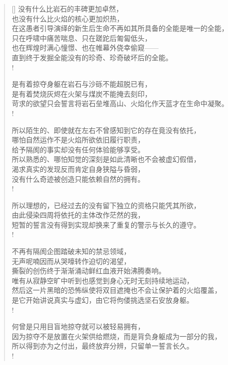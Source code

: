 \documentclass[UTF8, 12pt, a4paper]{ctexrep} %
\begin{document}
\begin{verse}[\versewidth]
没有什么比岩石的丰碑更加卓然，\\
也没有什么比火焰的核心更加炽热，\\
在这愚者引导演绎的新生后生命不再如其所具备的全能是唯一的全能，\\
只在呼啸中痛苦喘息、只在蹉跎后匍匐低头，\\
也在辉煌时满心憧憬、也在帷幕外侥幸偷窥——\\
直到终于发掘全能没有的珍奇、珍奇破坏后的全能。\\!

是有着掠夺身躯在岩石与沙砾不能超脱已有，\\
是有着焚烧灰烬在火架与煤炭不能掩去刻印，\\
苛求的欲望只会誓言将岩石垒堆高山、火焰化作天蓝才在生命中凝聚。\\!

所以陌生的、即使就在左右不曾感知到它的存在竟没有依托，\\
哪怕自然运作不是火焰所欲依旧履行职责，\\
给予隔阂的事实却没有任何体验能够享受。\\
所以熟悉的、哪怕知觉的深刻是如此清晰也不会被虚幻假借，\\
渴求真实的发现反而肯定自身狭隘与昏弱，\\
没有什么奇迹被创造只能依赖自然的拥有。\\!

所以理想的，已经过去的没有留下独立的资格只能凭其所欲，\\
由此侵染四周将依托的主体改作茫然的我，\\
短暂的誓言没有得到实现却换来了重复的警示与长久的遵守。\\!

不再有隔阂企图踏破未知的禁忌领域，\\
无声呢喃因而从哭嚎转作迫切的渴望，\\
撕裂的创伤终于渐渐涌动鲜红血液开始沸腾奏响。\\
唯有从寂静空旷中听到也感觉到身心无时无刻持续地运动，\\
然后这一片黑暗的恐怖纵使将双目遮掩也不会让保护着的火焰覆盖，\\
是它开始讲说真实与虚幻，由它将佝偻挑选坚石安放身躯。\\!

何曾是只用目盲地掠夺就可以被轻易拥有，\\
因为掠夺不是放置在火架供给燃烧，而是背负身躯成为一部分的我，\\
所以得到亦为之付出，最终放弃分辨，只留单一誓言长久。\\!


\end{verse}
\end{document}
